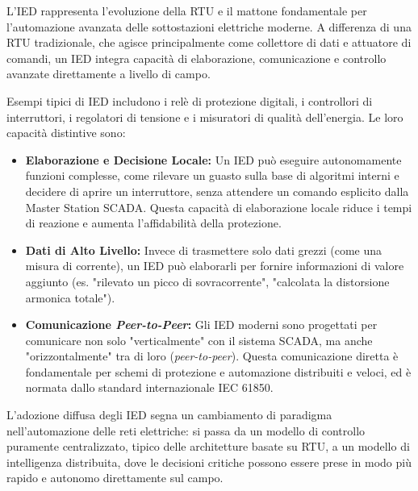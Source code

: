 L'IED rappresenta l'evoluzione della RTU e il mattone fondamentale per l'automazione avanzata delle sottostazioni elettriche moderne. A differenza di una RTU tradizionale, che agisce principalmente come collettore di dati e attuatore di comandi, un IED integra capacità di elaborazione, comunicazione e controllo avanzate direttamente a livello di campo.


Esempi tipici di IED includono i relè di protezione digitali, i controllori di interruttori, i regolatori di tensione e i misuratori di qualità dell'energia. Le loro capacità distintive sono:


\begin{itemize}
    \item \textbf{Elaborazione e Decisione Locale:} Un IED può eseguire autonomamente funzioni complesse, come rilevare un guasto sulla base di algoritmi interni e decidere di aprire un interruttore, senza attendere un comando esplicito dalla Master Station SCADA. Questa capacità di elaborazione locale riduce i tempi di reazione e aumenta l'affidabilità della protezione.
    \item \textbf{Dati di Alto Livello:} Invece di trasmettere solo dati grezzi (come una misura di corrente), un IED può elaborarli per fornire informazioni di valore aggiunto (es. "rilevato un picco di sovracorrente", "calcolata la distorsione armonica totale").
    \item \textbf{Comunicazione \textit{Peer-to-Peer}:} Gli IED moderni sono progettati per comunicare non solo "verticalmente" con il sistema SCADA, ma anche "orizzontalmente" tra di loro (\textit{peer-to-peer}). Questa comunicazione diretta è fondamentale per schemi di protezione e automazione distribuiti e veloci, ed è normata dallo standard internazionale IEC 61850.
\end{itemize}


L'adozione diffusa degli IED segna un cambiamento di paradigma nell'automazione delle reti elettriche: si passa da un modello di controllo puramente centralizzato, tipico delle architetture basate su RTU, a un modello di intelligenza distribuita, dove le decisioni critiche possono essere prese in modo più rapido e autonomo direttamente sul campo.

